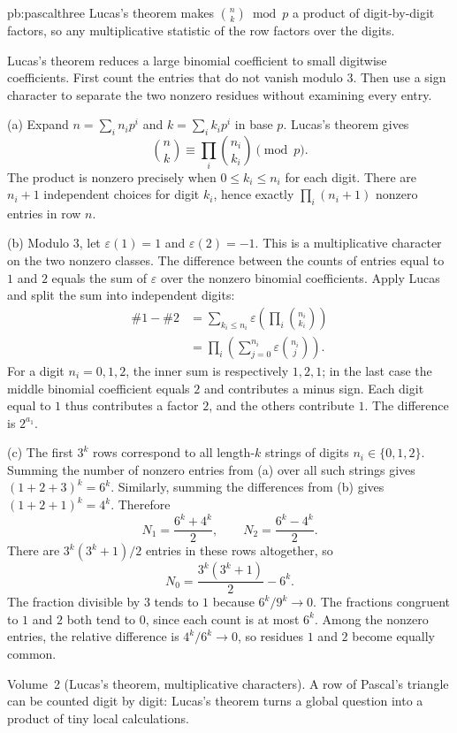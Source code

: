 \begin{solution}{pb:pascalthree}
\idea Lucas's theorem makes $\binom nk\bmod p$ a product of digit-by-digit factors, so any multiplicative statistic of the row
factors over the digits.

\writeup
Lucas's theorem reduces a large binomial coefficient to small digitwise coefficients. First count the entries that do not vanish modulo $3$. Then use a sign character to separate the two nonzero residues without examining every entry.

 (a) Expand $n=\sum_i n_ip^i$ and $k=\sum_i k_ip^i$ in base $p$. Lucas's theorem gives
\[
\binom nk\equiv\prod_i\binom{n_i}{k_i}\pmod p.
\]
The product is nonzero precisely when $0\le k_i\le n_i$ for each digit. There are $n_i+1$ independent choices for digit $k_i$, hence exactly $\prod_i(n_i+1)$ nonzero entries in row $n$.

(b) Modulo $3$, let $\varepsilon(1)=1$ and $\varepsilon(2)=-1$. This is a multiplicative character on the two nonzero classes. The difference between the counts of entries equal to $1$ and $2$ equals the sum of $\varepsilon$ over the nonzero binomial coefficients. Apply Lucas and split the sum into independent digits:
\[
\begin{aligned}
\#1-\#2
&=\sum_{k_i\le n_i}\varepsilon\left(\prod_i\binom{n_i}{k_i}\right)\\
&=\prod_i\left(\sum_{j=0}^{n_i}\varepsilon\binom{n_i}j\right).
\end{aligned}
\]
For a digit $n_i=0,1,2$, the inner sum is respectively $1,2,1$; in the last case the middle binomial coefficient equals $2$ and contributes a minus sign. Each digit equal to $1$ thus contributes a factor $2$, and the others contribute $1$. The difference is $2^{a_1}$.

(c) The first $3^k$ rows correspond to all length-$k$ strings of digits $n_i\in\{0,1,2\}$. Summing the number of nonzero entries from (a) over all such strings gives $(1+2+3)^k=6^k$. Similarly, summing the differences from (b) gives $(1+2+1)^k=4^k$. Therefore
\[
N_1=\frac{6^k+4^k}2,\qquad
N_2=\frac{6^k-4^k}2.
\]
There are $3^k(3^k+1)/2$ entries in these rows altogether, so
\[
N_0=\frac{3^k(3^k+1)}2-6^k.
\]
The fraction divisible by $3$ tends to $1$ because $6^k/9^k\to0$. The fractions congruent to $1$ and $2$ both tend to $0$, since each count is at most $6^k$. Among the nonzero entries, the relative difference is $4^k/6^k\to0$, so residues $1$ and $2$ become equally common.

\tools Volume~2 (Lucas's theorem, multiplicative characters).
\leads A row of Pascal's triangle can be counted digit by digit: Lucas's theorem turns a global question into a product of tiny local calculations.
\end{solution}


